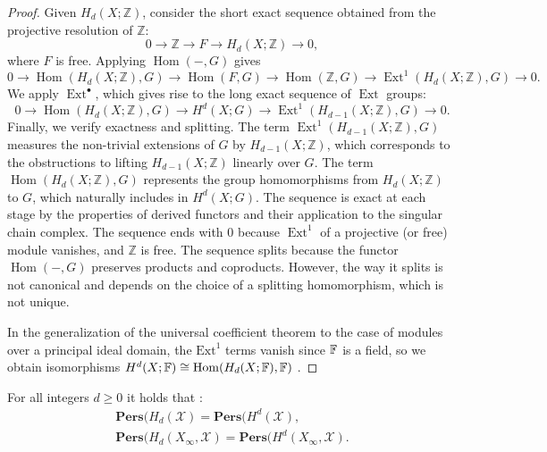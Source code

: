 \begin{proof}
	Given $H_{d}(X; \mathbb{Z})$, consider the short exact sequence obtained from the
	projective resolution of $\mathbb{Z}$:
	\[
		0 \rightarrow \mathbb{Z}\rightarrow F \rightarrow H_{d}(X; \mathbb{Z}) \rightarrow
		0,
	\]
	where $F$ is free. Applying $\operatorname{Hom}(-, G)$ gives
	\[
		0 \rightarrow \operatorname{Hom}(H_{d}(X; \mathbb{Z}), G) \rightarrow \operatorname{Hom}
		(F, G) \rightarrow \operatorname{Hom}(\mathbb{Z}, G) \rightarrow \operatorname{Ext}
		^{1}(H_{d}(X; \mathbb{Z}), G) \rightarrow 0.
	\]
	We apply $\operatorname{Ext}^{\bullet}$, which gives rise to the long exact
	sequence of $\operatorname{Ext}$ groups:
	\[
		0 \rightarrow \operatorname{Hom}(H_{d}(X; \mathbb{Z}), G) \rightarrow H^{d}(X
		; G) \rightarrow \operatorname{Ext}^{1}(H_{d-1}(X; \mathbb{Z}), G) \rightarrow
		0.
	\]
	Finally, we verify exactness and splitting. The term $\operatorname{Ext}^{1}(H_{d-1}
	(X; \mathbb{Z}), G)$ measures the non-trivial extensions of $G$ by $H_{d-1}(X;
	\mathbb{Z})$, which corresponds to the obstructions to lifting
	$H_{d-1}(X; \mathbb{Z})$ linearly over $G$. The term $\operatorname{Hom}(H_{d}(
	X; \mathbb{Z}), G)$ represents the group homomorphisms from $H_{d}(X; \mathbb{Z}
	)$ to $G$, which naturally includes in $H^{d}(X; G)$. The sequence is exact at
	each stage by the properties of derived functors and their application to the singular
	chain complex. The sequence ends with $0$ because $\operatorname{Ext}^{1}$ of
	a projective (or free) module vanishes, and $\mathbb{Z}$ is free. The sequence
	splits because the functor $\operatorname{Hom}(-, G)$ preserves products and
	coproducts. However, the way it splits is not canonical and depends on the
	choice of a splitting homomorphism, which is not unique.

	In the generalization of the universal coefficient theorem to the case of modules
	over a principal ideal domain, the $\text{Ext}^{1}$ terms vanish since ${\mathbb{F}}$ is
	a field, so we obtain isomorphisms $H^{d}(X;{\mathbb{F}}) \cong {\mathrm{Hom}}(H_{d}(X;{\mathbb{F}}),{\mathbb{F}})$ \cite[p.198
	\S 3.3.1]{hatcher2005algebraic}.
\end{proof}

\begin{theorem}
	For all integers $d \geq 0$ it holds that \cite[\S 2.3]{de2011dualities}:
	\begin{align*}
		\textbf{Pers}(H_{d}(\mathcal{X}) = \textbf{Pers}(H^{d}(\mathcal{X}),                         \\
		\textbf{Pers}(H_{d}(X_{\infty}, \mathcal{X}) = \textbf{Pers}(H^{d}(X_{\infty}, \mathcal{X}).
	\end{align*}
\end{theorem}

